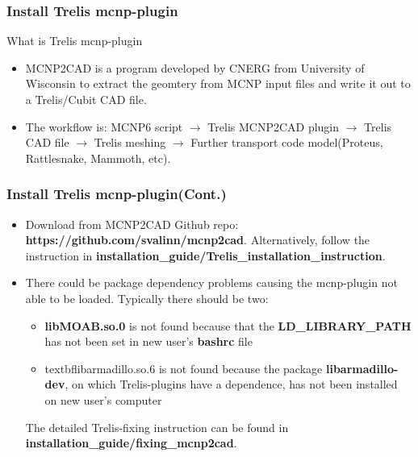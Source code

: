 \documentclass[fleqn]{beamer}
\begin{document}
\begin{frame}
\frametitle{Install Trelis mcnp-plugin}
\begin{block}{What is Trelis mcnp-plugin}
\begin{itemize}
 \item MCNP2CAD  is a program developed by CNERG from University of Wisconsin to extract the geomtery from MCNP input files and write it out
to a Trelis/Cubit CAD file.
 \item The workflow is: MCNP6 script $\rightarrow$ Trelis MCNP2CAD plugin $\rightarrow$ Trelis CAD file $\rightarrow$ Trelis meshing $\rightarrow$ Further transport code model(Proteus, Rattlesnake, Mammoth, etc). 
\end{itemize}
\end{block}
\end{frame}

\begin{frame}
\frametitle{Install Trelis mcnp-plugin(Cont.)}
\begin{itemize}
\item Download from MCNP2CAD Github repo: \textbf{https://github.com/svalinn/mcnp2cad}. Alternatively, follow the instruction in \textbf{installation\_guide/Trelis\_installation\_instruction}.
 \item There could be package dependency problems causing the mcnp-plugin not able to be loaded. Typically there should be two:
 \begin{itemize}
  \item  \textbf{libMOAB.so.0} is not found because that the \textbf{LD\_LIBRARY\_PATH} has not been set in new user's \textbf{bashrc} file
  \item textbf{libarmadillo.so.6} is not found because the package \textbf{libarmadillo-dev}, on which Trelis-plugins have a dependence, has not been
   installed on new user's computer
 \end{itemize}

The detailed Trelis-fixing instruction can be found in \textbf{installation\_guide/fixing\_mcnp2cad}.
\end{itemize}
\end{frame}















\end{document}
